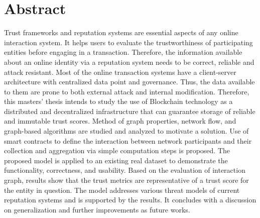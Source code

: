 \chapter*{Abstract}
Trust frameworks and reputation systems are essential aspects of any online
interaction system. It helps users to evaluate the trustworthiness of
participating entities before engaging in a transaction. Therefore, the
information available about an online identity via a reputation system needs to
be correct, reliable and attack resistant. Most of the online transaction
systems have a client-server architecture with centralized data point and
governance. Thus, the data available to them are prone to both external attack
and internal modification. Therefore, this masters' thesis intends to study the
use of Blockchain technology as a distributed and decentralized infrastructure
that can guarantee storage of reliable and immutable trust scores. Method of
graph properties, network flow, and graph-based algorithms are studied and
analyzed to motivate a solution. Use of smart contracts to define the
interaction between network participants and their collection and aggregation
via simple computation steps is proposed. The proposed model is applied to an
existing real dataset to demonstrate the functionality, correctness, and
usability. Based on the evaluation of interaction graph, results show that
the trust metrics are representative of a trust score for the entity in
question. The model addresses various threat models of current reputation
systems and is supported by the results. It concludes with a discussion on
generalization and further improvements as future works. 
